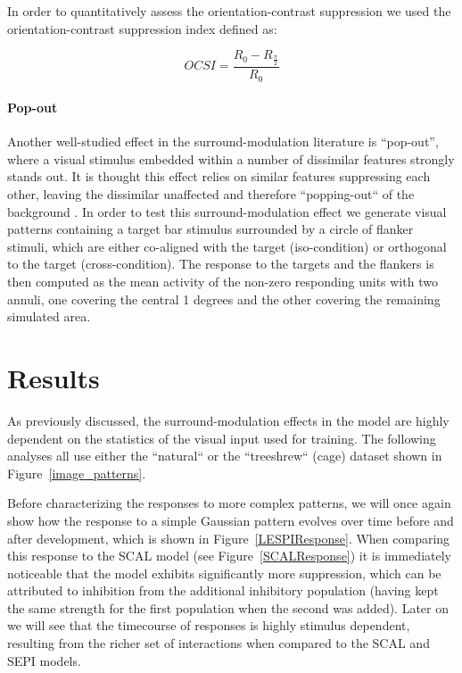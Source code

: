 In order to quantitatively assess the orientation-contrast suppression
we used the orientation-contrast suppression index defined as:

\begin{equation}
  OCSI = \frac{R_0 - R_{\frac{\pi}{2}}}{R_0}
\end{equation}

\paragraph{Pop-out}

Another well-studied effect in the surround-modulation
literature is ``pop-out'', where a visual stimulus 
embedded within a number of dissimilar features strongly stands
out. It is thought this effect relies on similar features suppressing
each other, leaving the dissimilar unaffected and therefore
``popping-out`` of the background \citep{Kastner1997}. In order to
test this surround-modulation effect we generate visual patterns
containing a target bar stimulus surrounded by a circle of flanker
stimuli, which are either co-aligned with the target (iso-condition)
or orthogonal to the target (cross-condition).
The response to the targets and the flankers is then computed as the
mean activity of the non-zero responding units with two annuli, one
covering the central 1 degrees and the other covering the remaining
simulated area.

\section{Results}

As previously discussed, the surround-modulation effects in the model
are highly dependent on the statistics of the visual input used for
training. The following analyses all use either the ``natural`` or the
``treeshrew`` (cage) dataset shown in Figure~\ref{image_patterns}.

Before characterizing the responses to more complex patterns, we will
once again show how the response to a simple Gaussian pattern evolves
over time before and after development, which is shown in
Figure~\ref{LESPIResponse}. When comparing this response to the SCAL
model (see Figure~\ref{SCALResponse}) it is immediately noticeable
that the model exhibits significantly more suppression, which can be
attributed to inhibition from the additional inhibitory population
(having kept the same strength for the first population when the
second was added). Later on we will see that the timecourse of
responses is highly stimulus dependent, resulting from the richer set
of interactions when compared to the SCAL and SEPI models.

